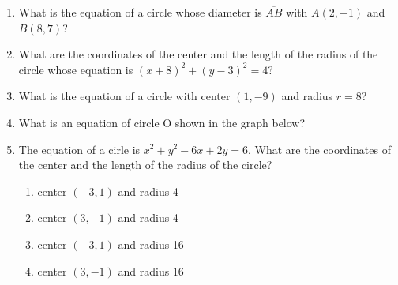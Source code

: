 \documentclass[12pt, oneside]{article}
\begin{document}
\begin{enumerate}[itemsep=0cm]
\item What is the equation of a circle whose diameter is $\overline{AB}$ with $A(2,-1)$ and $B(8,7)$?
    \begin{flushright}
    \end{flushright}

\item What are the coordinates of the center and the length of the radius of the circle whose equation is $(x+8)^2+(y-3)^2=4$?

\item What is the equation of a circle with center $(1,-9)$ and radius $r=8$?
  
\item What is an equation of circle O shown in the graph below?
  \begin{center}
  \end{center}

\item The equation of a cirle is $x^2+y^2-6x+2y=6$. What are the coordinates of the center and the length of the radius of the circle?
  \begin{enumerate}
    \item center $(-3,1)$ and radius 4
    \item center $(3,-1)$ and radius 4
    \item center $(-3,1)$ and radius 16
    \item center $(3,-1)$ and radius 16
  \end{enumerate}

\newpage

\end{enumerate}
\end{document}

